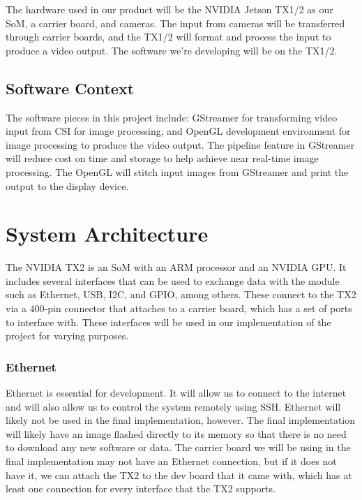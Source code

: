 \documentclass[letterpaper,10pt,serif,draftclsnofoot,onecolumn,compsoc,titlepage]{IEEEtran}
\begin{document}
The hardware used in our product will be the NVIDIA Jetson TX1/2 as our SoM, 
a carrier board, and cameras. The input from cameras will be transferred through 
carrier boards, and the TX1/2 will format and process the input to produce a 
video output. The software we're developing will be on the TX1/2. \\

\subsection{Software Context}

The software pieces in this project include: GStreamer for transforming video input 
from CSI for image processing, and OpenGL development environment for image processing 
to produce the video output. The pipeline feature in GStreamer will reduce 
cost on time and storage to help achieve near real-time image processing. The OpenGL 
will stitch input images from GStreamer and print the output to the display device. \\

\section{System Architecture}
The NVIDIA TX2 is an SoM with an ARM processor and an NVIDIA GPU. It includes several interfaces that can be used to exchange data with the module such as Ethernet, USB, I2C, and GPIO, among others. These connect to the TX2 via a 400-pin connector that attaches to a carrier board, which has a set of ports to interface with. These interfaces will be used in our implementation of the project for varying purposes.

\subsubsection{Ethernet}
Ethernet is essential for development. It will allow us to connect to the internet and will also allow us to control the system remotely using SSH. Ethernet will likely not be used in the final implementation, however. The final implementation will likely have an image flashed directly to its memory so that there is no need to download any new software or data. The carrier board we will be using in the final implementation may not have an Ethernet connection, but if it does not have it, we can attach the TX2 to the dev board that it came with, which has at least one connection for every interface that the TX2 supports.
\end{document}
